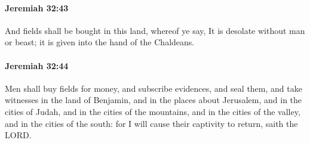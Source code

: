 		\paragraph{Jeremiah 32:43} %
			\label{JEREMIAH-32-43}

			And fields shall be bought in this land, whereof ye say, It is desolate without man or beast; it is given into the hand of the Chaldeans.


		\paragraph{Jeremiah 32:44} %
			\label{JEREMIAH-32-44}

			Men shall buy fields for money, and subscribe evidences, and seal them, and take witnesses in the land of Benjamin, and in the places about Jerusalem, and in the cities of Judah, and in the cities of the mountains, and in the cities of the valley, and in the cities of the south: for I will cause their captivity to return, saith the LORD.

